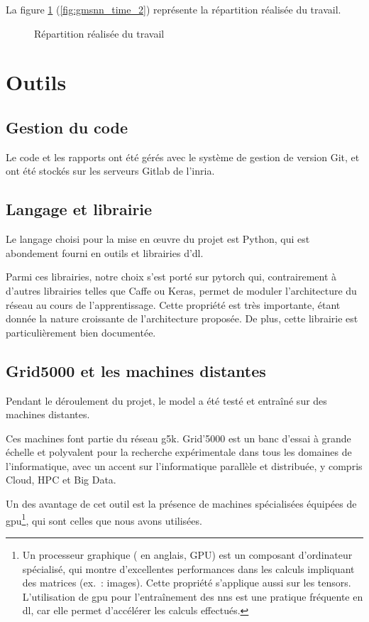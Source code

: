 La figure \ref{fig:gmsnn_time_2} (\autoref{fig:gmsnn_time_2}) représente la répartition réalisée du travail.

\begin{figure}[ht]
	\centering
	\caption{Répartition réalisée du travail}\label{fig:gmsnn_time_2}
\end{figure}

\pagebreak
\section{Outils}
\subsection{Gestion du code}
Le code et les rapports ont été gérés avec le système de gestion de version Git, et ont été stockés sur les serveurs Gitlab de l'\gls{inria}.

\subsection{Langage et librairie}
Le langage choisi pour la mise en œuvre du projet est Python, qui est abondement fourni en outils et librairies d'\gls{dl}.

Parmi ces librairies, notre choix s'est porté sur \gls{pytorch} qui, contrairement à d'autres librairies telles que Caffe ou Keras, permet de moduler l'architecture du réseau au cours de l'apprentissage. Cette propriété est très importante, étant donnée la nature \og croissante\fg{} de l'architecture proposée. De plus, cette librairie est particulièrement bien documentée.

\subsection{Grid5000 et les machines distantes}
Pendant le déroulement du projet, le \gls{model} a été testé et entraîné sur des machines distantes.

Ces machines font partie du réseau \gls{g5k}.
\og Grid'5000 est un banc d'essai à grande échelle et polyvalent pour la recherche expérimentale dans tous les domaines de l'informatique, avec un accent sur l'informatique parallèle et distribuée, y compris Cloud, HPC et Big Data.\fg{}~\autocite{g5k}

Un des avantage de cet outil est la présence de machines spécialisées équipées de \gls{gpu}\footnote{Un processeur graphique ( en anglais, GPU) est un composant d'ordinateur spécialisé, qui montre d'excellentes performances dans les calculs impliquant des \glspl{matrice} (ex.~: images). Cette propriété s'applique aussi sur les \glspl{tensor}. L'utilisation de \gls{gpu} pour l'entraînement des \glspl{nn} est une pratique fréquente en \gls{dl}, car elle permet d'accélérer les calculs effectués.}, qui sont celles que nous avons utilisées.